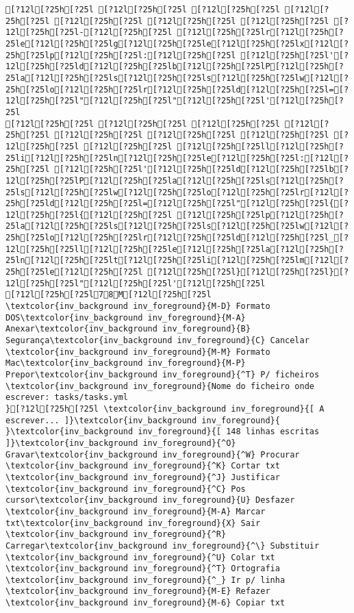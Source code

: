 \documentclass{scrartcl}
\begin{document}
\begin{Verbatim}
[?12l[?25h[?25l [?12l[?25h[?25l [?12l[?25h[?25l [?12l[?25h[?25l [?12l[?25h[?25l [?12l[?25h[?25l [?12l[?25h[?25l [?12l[?25h[?25l-[?12l[?25h[?25l [?12l[?25h[?25lr[?12l[?25h[?25le[?12l[?25h[?25lg[?12l[?25h[?25le[?12l[?25h[?25lx[?12l[?25h[?25lp[?12l[?25h[?25l:[?12l[?25h[?25l [?12l[?25h[?25l'[?12l[?25h[?25ld[?12l[?25h[?25lb[?12l[?25h[?25lP[?12l[?25h[?25la[?12l[?25h[?25ls[?12l[?25h[?25ls[?12l[?25h[?25lw[?12l[?25h[?25lo[?12l[?25h[?25lr[?12l[?25h[?25ld[?12l[?25h[?25l=[?12l[?25h[?25l"[?12l[?25h[?25l"[?12l[?25h[?25l'[?12l[?25h[?25l
[?12l[?25h[?25l [?12l[?25h[?25l [?12l[?25h[?25l [?12l[?25h[?25l [?12l[?25h[?25l [?12l[?25h[?25l [?12l[?25h[?25l [?12l[?25h[?25l [?12l[?25h[?25l [?12l[?25h[?25ll[?12l[?25h[?25li[?12l[?25h[?25ln[?12l[?25h[?25le[?12l[?25h[?25l:[?12l[?25h[?25l [?12l[?25h[?25l'[?12l[?25h[?25ld[?12l[?25h[?25lb[?12l[?25h[?25lP[?12l[?25h[?25la[?12l[?25h[?25ls[?12l[?25h[?25ls[?12l[?25h[?25lw[?12l[?25h[?25lo[?12l[?25h[?25lr[?12l[?25h[?25ld[?12l[?25h[?25l=[?12l[?25h[?25l"[?12l[?25h[?25l{[?12l[?25h[?25l{[?12l[?25h[?25l [?12l[?25h[?25lp[?12l[?25h[?25la[?12l[?25h[?25ls[?12l[?25h[?25ls[?12l[?25h[?25lw[?12l[?25h[?25lo[?12l[?25h[?25lr[?12l[?25h[?25ld[?12l[?25h[?25l_[?12l[?25h[?25ll[?12l[?25h[?25le[?12l[?25h[?25la[?12l[?25h[?25ln[?12l[?25h[?25lt[?12l[?25h[?25li[?12l[?25h[?25lm[?12l[?25h[?25le[?12l[?25h[?25l [?12l[?25h[?25l}[?12l[?25h[?25l}[?12l[?25h[?25l"[?12l[?25h[?25l'[?12l[?25h[?25l
[?12l[?25h[?25l78M[?12l[?25h[?25l         \textcolor{inv_background inv_foreground}{M-D} Formato DOS\textcolor{inv_background inv_foreground}{M-A} Anexar\textcolor{inv_background inv_foreground}{B} Segurança\textcolor{inv_background inv_foreground}{C} Cancelar           \textcolor{inv_background inv_foreground}{M-M} Formato Mac\textcolor{inv_background inv_foreground}{M-P} Prepor\textcolor{inv_background inv_foreground}{^T} P/ ficheiros
\textcolor{inv_background inv_foreground}{Nome do ficheiro onde escrever: tasks/tasks.yml                                                                                           }[?12l[?25h[?25l \textcolor{inv_background inv_foreground}{[ A escrever... ]}\textcolor{inv_background inv_foreground}{          }\textcolor{inv_background inv_foreground}{[ 148 linhas escritas ]}\textcolor{inv_background inv_foreground}{^O} Gravar\textcolor{inv_background inv_foreground}{^W} Procurar      \textcolor{inv_background inv_foreground}{^K} Cortar txt    \textcolor{inv_background inv_foreground}{^J} Justificar    \textcolor{inv_background inv_foreground}{^C} Pos cursor\textcolor{inv_background inv_foreground}{U} Desfazer     \textcolor{inv_background inv_foreground}{M-A} Marcar txt\textcolor{inv_background inv_foreground}{X} Sair    \textcolor{inv_background inv_foreground}{^R} Carregar\textcolor{inv_background inv_foreground}{^\} Substituir    \textcolor{inv_background inv_foreground}{^U} Colar txt     \textcolor{inv_background inv_foreground}{^T} Ortografia    \textcolor{inv_background inv_foreground}{^_} Ir p/ linha   \textcolor{inv_background inv_foreground}{M-E} Refazer      \textcolor{inv_background inv_foreground}{M-6} Copiar txt

\end{Verbatim}
\end{document}
